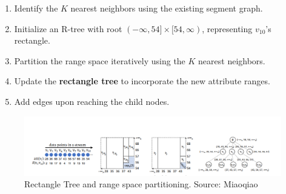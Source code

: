 \begin{enumerate}  
    \item Identify the $K$ nearest neighbors using the existing segment graph.  
    \item Initialize an R-tree with root $(-\infty, 54] \times [54, \infty)$, representing $v_{10}$'s rectangle.  
    \item Partition the range space iteratively using the $K$ nearest neighbors.  
    \item Update the \textbf{rectangle tree} to incorporate the new attribute ranges.  
    \item Add edges upon reaching the child nodes.  
\end{enumerate} 



\begin{figure}[h]
    \centering
\includegraphics[width=1.1\textwidth]{IMAGES/immagine_2025-03-01_191002770.png}
    \caption[Rectangle Tree]{Rectangle Tree and range space partitioning. Source: Miaoqiao\footnotemark[2]}
    \label{fig:Rectangle Tree}
\end{figure}
